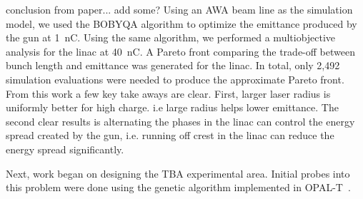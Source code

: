 \documentclass{iitthesis}
\newcommand{\nrnote}[1]{\textsf{{\color{blue}{ NN note:}   #1 }}}
\begin{document}
\nrnote{conclusion from paper... add some?}
Using an AWA beam line as the simulation model, we used the BOBYQA algorithm 
to optimize the emittance produced by the gun at \SI{1}{nC}.
Using the same algorithm, we performed a multiobjective analysis for the linac at \SI{40}{nC}. 
A Pareto front comparing the trade-off between bunch length and emittance was generated for the linac. 
In total, only 2,492 simulation evaluations were needed to produce the approximate Pareto front.
From this work a few key take aways are clear. First, larger laser radius
is uniformly better for high charge. i.e large radius helps lower emittance.
The second clear results is alternating the phases in the linac can control 
the energy spread created by the gun, i.e. running off crest in the linac 
can reduce the energy spread significantly.

 \label{sec:ga}
Next, work began on designing the TBA experimental area. 
Initial probes into this problem were done using the genetic algorithm
implemented in OPAL-T~\cite{optpilot}.






\end{document}
